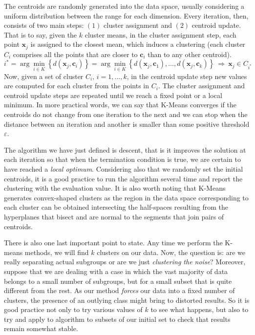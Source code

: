 \documentclass[a4paper]{article}
\begin{document}
	The centroids are randomly generated into the data space, usually considering a uniform distribution between the range for each dimension. Every iteration, then, consists of two main steps: $(1)$ cluster assignment and $(2)$ centroid update. That is to say, given the $k$ cluster means, in the cluster assignment step, each point $\boldsymbol{x}_{j}$ is assigned to the closest mean, which induces a clustering (each cluster $C_{i}$ comprises all the points that are closer to $\boldsymbol{c}_{i}$ than to any other centroid).
	\begin{equation*}
	i^{*}=\arg\underset{i\in K}{ \min}\left\{ d(\boldsymbol{x}_{j},\boldsymbol{c}_{i})\right\} =\arg\min_{i \in K}\left\{ d(\boldsymbol{x}_{j},\boldsymbol{c}_{1}),\ldots,d(\boldsymbol{x}_{j},\boldsymbol{c}_{k})\right\} \:\Longrightarrow\:\boldsymbol{x}_{j}\in C_{i^{*}}
	\end{equation*}
	Now, given a set of cluster $C_{i},\, i=1,...,k$, in the centroid update step new values are computed for each cluster from the points in $C_{i}$. The cluster assignment and centroid update steps are repeated until we reach a fixed point or a local minimum. In more practical words, we can say that K-Means converges if the centroids do not change from one iteration to the next and we can stop when the distance between an iteration and another is smaller than some positive threshold $\varepsilon$.

	The algorithm we have just defined is descent, that is it improves
	the solution at each iteration so that when the termination condition
	is true, we are certain to have reached a \textsl{local optimum}.
	Considering also that we randomly set the initial centroids, it is a good practice to run the algorithm several time and report the clustering with the evaluation value. It is also worth noting that K-Means generates convex-shaped clusters as the region in the data space corresponding to each cluster can be obtained intersecting the half-spaces resulting from the hyperplanes that bisect and are normal to the segments that join pairs of centroids.

	There is also one last important point to state. Any time we perform
	the K-means methods, we will find $k$ clusters on our data. Now,
	the question is: are we really separating actual subgroups or are
	we just \textsl{clustering the noise}? Moreover, suppose that we are
	dealing with a case in which the vast majority of data belongs to
	a small number of subgroups, but for a small subset that is quite
	different from the rest. As our method \textsl{forces} our data into
	a fixed number of clusters, the presence of an outlying class might
	bring to distorted results. So it is good practice not only to try
	various values of $k$ to see what happens, but also to try and apply
	to algorithm to subsets of our initial set to check that results remain
	somewhat stable.
\end{document}

